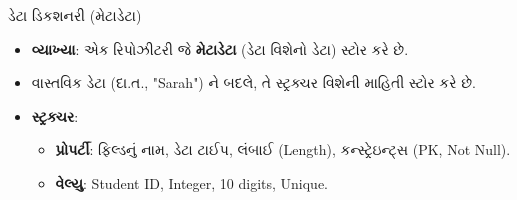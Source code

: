 \documentclass[aspectratio=169, 10pt]{beamer}
\begin{document}
\begin{frame}{ડેટા ડિકશનરી (મેટાડેટા)}
    \begin{itemize}
        \item \textbf{વ્યાખ્યા}: એક રિપોઝીટરી જે \textbf{મેટાડેટા} (ડેટા વિશેનો ડેટા) સ્ટોર કરે છે.
        \item વાસ્તવિક ડેટા (દા.ત., "Sarah") ને બદલે, તે સ્ટ્રક્ચર વિશેની માહિતી સ્ટોર કરે છે.
        \item \textbf{સ્ટ્રક્ચર}:
        \begin{itemize}
            \item \textbf{પ્રોપર્ટી}: ફિલ્ડનું નામ, ડેટા ટાઈપ, લંબાઈ (Length), કન્સ્ટ્રેઇન્ટ્સ (PK, Not Null).
            \item \textbf{વેલ્યુ}: Student ID, Integer, 10 digits, Unique.
        \end{itemize}
    \end{itemize}
\note{
}
\end{frame}
\end{document}
